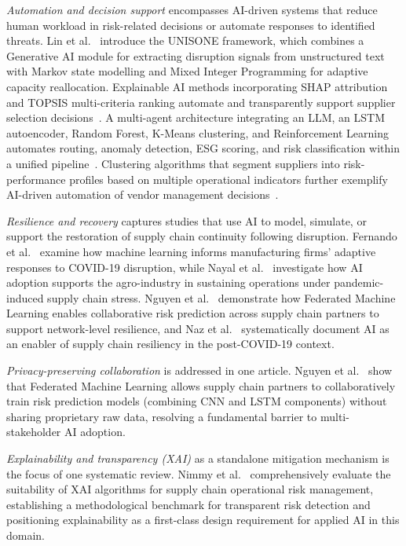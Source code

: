 \textit{Automation and decision support} encompasses AI-driven systems that reduce human workload in risk-related decisions or automate responses to identified threats. Lin et al.~\cite{lin2025generative} introduce the UNISONE framework, which combines a Generative AI module for extracting disruption signals from unstructured text with Markov state modelling and Mixed Integer Programming for adaptive capacity reallocation. Explainable AI methods incorporating SHAP attribution and TOPSIS multi-criteria ranking automate and transparently support supplier selection decisions~\cite{kumar2023enhancing}. A multi-agent architecture integrating an LLM, an LSTM autoencoder, Random Forest, K-Means clustering, and Reinforcement Learning automates routing, anomaly detection, ESG scoring, and risk classification within a unified pipeline~\cite{rajesh2025smartops}. Clustering algorithms that segment suppliers into risk-performance profiles based on multiple operational indicators further exemplify AI-driven automation of vendor management decisions~\cite{gupta2025supplier}.

\textit{Resilience and recovery} captures studies that use AI to model, simulate, or support the restoration of supply chain continuity following disruption. Fernando et al.~\cite{fernando2024covid} examine how machine learning informs manufacturing firms' adaptive responses to COVID-19 disruption, while Nayal et al.~\cite{nayal2022exploring} investigate how AI adoption supports the agro-industry in sustaining operations under pandemic-induced supply chain stress. Nguyen et al.~\cite{nguyen2024federated} demonstrate how Federated Machine Learning enables collaborative risk prediction across supply chain partners to support network-level resilience, and Naz et al.~\cite{naz2022artificial} systematically document AI as an enabler of supply chain resiliency in the post-COVID-19 context.

\textit{Privacy-preserving collaboration} is addressed in one article. Nguyen et al.~\cite{nguyen2024federated} show that Federated Machine Learning allows supply chain partners to collaboratively train risk prediction models (combining CNN and LSTM components) without sharing proprietary raw data, resolving a fundamental barrier to multi-stakeholder AI adoption.

\textit{Explainability and transparency (XAI)} as a standalone mitigation mechanism is the focus of one systematic review. Nimmy et al.~\cite{nimmy2022explainability} comprehensively evaluate the suitability of XAI algorithms for supply chain operational risk management, establishing a methodological benchmark for transparent risk detection and positioning explainability as a first-class design requirement for applied AI in this domain.

